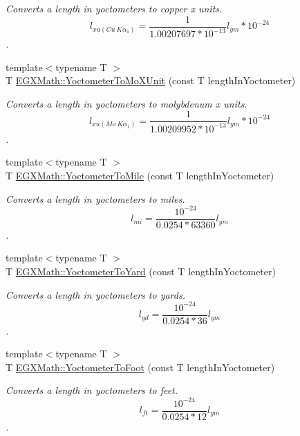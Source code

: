 \begin{DoxyCompactItemize}
\begin{DoxyCompactList}\small\item\em Converts a length in yoctometers to copper x units. \[ l_{xu(Cu\ K\alpha_1)}= \frac{1}{1.00207697*10^{-13}} l_{ym} * 10^{-24}\]. \end{DoxyCompactList}\item 
{\footnotesize template$<$typename T $>$ }\\T \mbox{\hyperlink{group___e_g_x_math-_conversions-_length_conversions-_s_i-_yoctometer-_non-_s_i_ga6a6a1fb3ecc97e377fc728c03327048e}{E\+G\+X\+Math\+::\+Yoctometer\+To\+Mo\+X\+Unit}} (const T length\+In\+Yoctometer)
\begin{DoxyCompactList}\small\item\em Converts a length in yoctometers to molybdenum x units. \[ l_{xu(Mo\ K\alpha_1)}=\frac{1}{1.00209952*10^{-13}} l_{ym} * 10^{-24}\]. \end{DoxyCompactList}\item 
{\footnotesize template$<$typename T $>$ }\\T \mbox{\hyperlink{group___e_g_x_math-_conversions-_length_conversions-_s_i-_yoctometer-_imperial_gae40e8cf52937348b127013a3dbe89105}{E\+G\+X\+Math\+::\+Yoctometer\+To\+Mile}} (const T length\+In\+Yoctometer)
\begin{DoxyCompactList}\small\item\em Converts a length in yoctometers to miles. \[ l_{mi}=\frac{10^{-24}}{0.0254 * 63360} l_{ym} \]. \end{DoxyCompactList}\item 
{\footnotesize template$<$typename T $>$ }\\T \mbox{\hyperlink{group___e_g_x_math-_conversions-_length_conversions-_s_i-_yoctometer-_imperial_gaa9c695208d05175797ee88adef7bd5f2}{E\+G\+X\+Math\+::\+Yoctometer\+To\+Yard}} (const T length\+In\+Yoctometer)
\begin{DoxyCompactList}\small\item\em Converts a length in yoctometers to yards. \[ l_{yd}= \frac{10^{-24}}{0.0254 * 36} l_{ym} \]. \end{DoxyCompactList}\item 
{\footnotesize template$<$typename T $>$ }\\T \mbox{\hyperlink{group___e_g_x_math-_conversions-_length_conversions-_s_i-_yoctometer-_imperial_gad8cb5223284af20fc0d29fefa17ec091}{E\+G\+X\+Math\+::\+Yoctometer\+To\+Foot}} (const T length\+In\+Yoctometer)
\begin{DoxyCompactList}\small\item\em Converts a length in yoctometers to feet. \[ l_{ft}= \frac{10^{-24}}{0.0254 * 12} l_{ym} \]. \end{DoxyCompactList}\item 

\end{DoxyCompactItemize}
